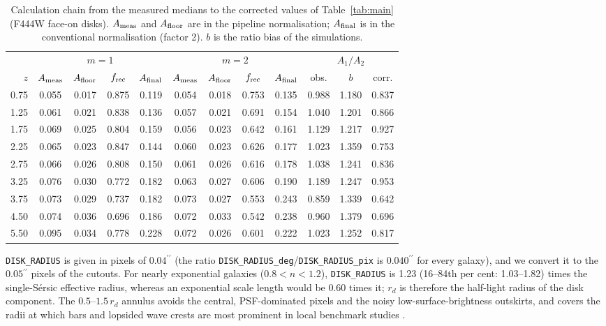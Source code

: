 \documentclass[fleqn,usenatbib]{mnras}
\providecommand{\arcsec}{\ensuremath{^{\prime\prime}}}
\begin{document}
\begin{table}
\centering
\caption{Calculation chain from the measured medians to the
corrected values of Table~\ref{tab:main} (F444W face-on disks).
$A_{\rm meas}$ and $A_{\rm floor}$ are in the pipeline normalisation;
$A_{\rm final}$ is in the conventional normalisation (factor 2). $b$
is the ratio bias of the simulations.}
\label{tab:chain}
\small
\begin{tabular}{rccccccccccc}
\hline
{} & \multicolumn{4}{c|}{$m=1$} & \multicolumn{4}{c|}{$m=2$} &
\multicolumn{3}{c}{$A_1/A_2$}\\
{$z$} & {$A_{\rm meas}$} & {$A_{\rm floor}$} &
{$f_{\rm rec}$} & {$A_{\rm final}$} &
{$A_{\rm meas}$} & {$A_{\rm floor}$} &
{$f_{\rm rec}$} & {$A_{\rm final}$} &
{obs.} & {$b$} & {corr.}
\\
\hline
0.75 & 0.055 & 0.017 & 0.875 & 0.119 & 0.054 & 0.018 & 0.753 & 0.135 & 0.988 & 1.180 & 0.837\\
1.25 & 0.061 & 0.021 & 0.838 & 0.136 & 0.057 & 0.021 & 0.691 & 0.154 & 1.040 & 1.201 & 0.866\\
1.75 & 0.069 & 0.025 & 0.804 & 0.159 & 0.056 & 0.023 & 0.642 & 0.161 & 1.129 & 1.217 & 0.927\\
2.25 & 0.065 & 0.023 & 0.847 & 0.144 & 0.060 & 0.023 & 0.626 & 0.177 & 1.023 & 1.359 & 0.753\\
2.75 & 0.066 & 0.026 & 0.808 & 0.150 & 0.061 & 0.026 & 0.616 & 0.178 & 1.038 & 1.241 & 0.836\\
3.25 & 0.076 & 0.030 & 0.772 & 0.182 & 0.063 & 0.027 & 0.606 & 0.190 & 1.189 & 1.247 & 0.953\\
3.75 & 0.073 & 0.029 & 0.737 & 0.182 & 0.073 & 0.027 & 0.553 & 0.243 & 0.859 & 1.339 & 0.642\\
4.50 & 0.074 & 0.036 & 0.696 & 0.186 & 0.072 & 0.033 & 0.542 & 0.238 & 0.960 & 1.379 & 0.696\\
5.50 & 0.095 & 0.034 & 0.778 & 0.228 & 0.072 & 0.026 & 0.601 & 0.222 & 1.023 & 1.252 & 0.817\\
\hline
\end{tabular}
\end{table}



\texttt{DISK\_RADIUS} is given in pixels of $0.04\arcsec$ (the ratio
\texttt{DISK\_RADIUS\_deg}/\texttt{DISK\_RADIUS\_pix} is $0.040\arcsec$ for every
galaxy), and we convert it to the $0.05\arcsec$ pixels of the cutouts. For
nearly exponential galaxies ($0.8<n<1.2$), \texttt{DISK\_RADIUS} is 1.23
(16--84th per cent: 1.03--1.82) times the single-S\'ersic effective radius,
whereas an exponential scale length would be 0.60 times it; $r_d$ is therefore
the half-light radius of the disk component. The $0.5$--$1.5\,r_d$ annulus
avoids the central, PSF-dominated pixels and the noisy low-surface-brightness
outskirts, and covers the radii at which bars and lopsided wave crests are most
prominent in local benchmark studies \citep{Zaritsky2013,Buta2015}.
\end{document}
